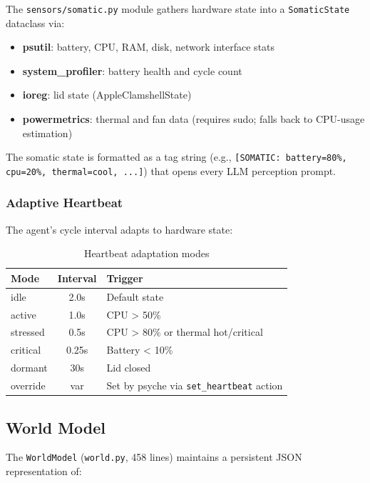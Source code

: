 \documentclass[11pt,oneside]{article}
\begin{document}
The \texttt{sensors/somatic.py} module gathers hardware state into a \texttt{SomaticState} dataclass via:

\begin{itemize}
  \item \textbf{psutil}: battery, CPU, RAM, disk, network interface stats
  \item \textbf{system\_profiler}: battery health and cycle count
  \item \textbf{ioreg}: lid state (AppleClamshellState)
  \item \textbf{powermetrics}: thermal and fan data (requires sudo; falls back to CPU-usage estimation)
\end{itemize}

The somatic state is formatted as a tag string (e.g., \texttt{[SOMATIC: battery=80\%, cpu=20\%, thermal=cool, ...]}) that opens every LLM perception prompt.

\subsubsection{Adaptive Heartbeat}

The agent's cycle interval adapts to hardware state:

\begin{table}[H]
\centering
\caption{Heartbeat adaptation modes}
\label{tab:heartbeat}
\small
\begin{tabular}{l c l}
\toprule
\textbf{Mode} & \textbf{Interval} & \textbf{Trigger} \\
\midrule
idle     & 2.0s  & Default state \\
active   & 1.0s  & CPU > 50\% \\
stressed & 0.5s  & CPU > 80\% or thermal hot/critical \\
critical & 0.25s & Battery < 10\% \\
dormant  & 30s   & Lid closed \\
override & var  & Set by psyche via \texttt{set\_heartbeat} action \\
\bottomrule
\end{tabular}
\end{table}

\subsection{World Model}

The \texttt{WorldModel} (\texttt{world.py}, 458 lines) maintains a persistent JSON representation of:
\end{document}
